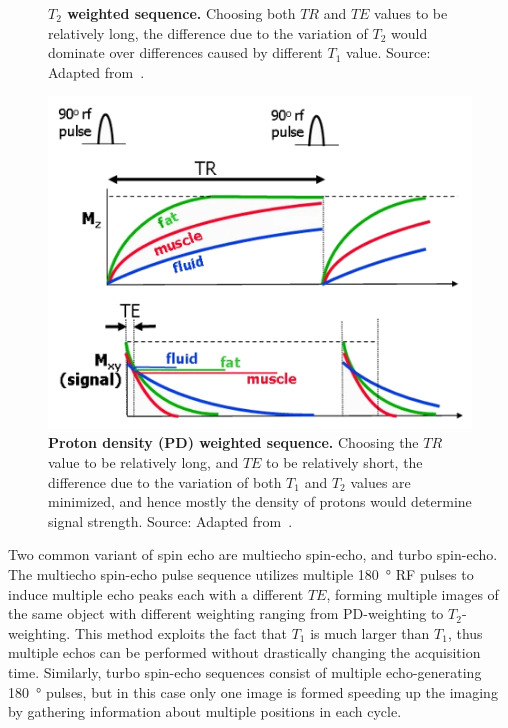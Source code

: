 \begin{figure}[tb]
\begin{minipage}[t]{.28\textwidth}
        \caption{\textbf{$T_2$ weighted sequence.} Choosing both $TR$ and $TE$ values to be relatively long, the difference due to the variation of $T_2$ would dominate over differences caused by different $T_1$ value. Source: Adapted from~\cite{ridgway_cardiovascular_2010}.}
        \label{fig:T2_weighted}
    \end{minipage}%
    \hspace{0.02\textwidth}
    \begin{minipage}[t]{0.34\textwidth}
        \centering
        \includegraphics[width=.85\linewidth]{images/PD_weighted.png}
        \caption{\textbf{Proton density (PD) weighted sequence.} Choosing the $TR$ value to be relatively long, and $TE$ to be relatively short, the difference due to the variation of both $T_1$ and $T_2$ values are minimized, and hence mostly the density of protons would determine signal strength. Source: Adapted from~\cite{ridgway_cardiovascular_2010}.}
        \label{fig:PD_weighted}
    \end{minipage}
\end{figure}

Two common variant of spin echo are multiecho spin-echo, and turbo spin-echo. The multiecho spin-echo pulse sequence utilizes multiple \SI{180}{\degree} RF pulses to induce multiple echo peaks each with a different $TE$, forming multiple images of the same object with different weighting ranging from PD-weighting to $T_2$-weighting. This method exploits the fact that $T_1$ is much larger than $T_1$, thus multiple echos can be performed without drastically changing the acquisition time. Similarly, turbo spin-echo sequences consist of multiple echo-generating \SI{180}{\degree} pulses, but in this case only one image is formed speeding up the imaging by gathering information about multiple positions in each cycle.


